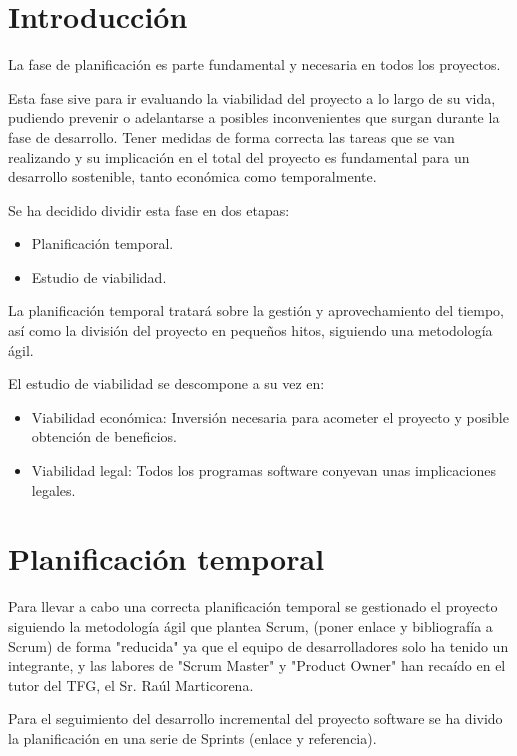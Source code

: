 
\section{Introducción}

La fase de planificación es parte fundamental y necesaria en todos los proyectos.

Esta fase sive para ir evaluando la viabilidad del proyecto a lo largo de su vida, pudiendo prevenir o adelantarse a posibles inconvenientes que surgan durante la fase de desarrollo.
Tener medidas de forma correcta las tareas que se van realizando y su implicación en el total del proyecto es fundamental para un desarrollo sostenible, tanto económica como temporalmente.

Se ha decidido dividir esta fase en dos etapas:

\begin{itemize}
	\item
	Planificación temporal.
	\item
	Estudio de viabilidad.
\end{itemize}

La planificación temporal tratará sobre la gestión y aprovechamiento del tiempo, así como la división del proyecto en pequeños hitos, siguiendo una metodología ágil.

El estudio de viabilidad se descompone a su vez en:

\begin{itemize}
	\item
	Viabilidad económica: Inversión necesaria para acometer el proyecto y posible obtención de beneficios.
	\item
	Viabilidad legal: Todos los programas software conyevan unas implicaciones legales.
\end{itemize}

\section{Planificación temporal}

Para llevar a cabo una correcta planificación temporal se gestionado el proyecto siguiendo la metodología ágil que plantea Scrum, (poner enlace y bibliografía a Scrum) de forma "reducida" ya que el equipo de desarrolladores solo ha tenido un integrante, y las labores de "Scrum Master" y "Product Owner" han recaído en el tutor del TFG, el Sr. Raúl Marticorena.

Para el seguimiento del desarrollo incremental del proyecto software se ha divido la planificación en una serie de Sprints (enlace y referencia).

